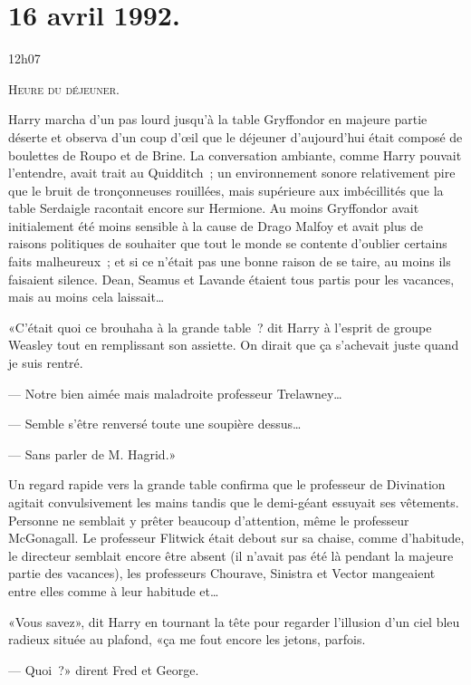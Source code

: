 
\section{16 avril 1992.}

12h07

\lettrine{H}{eure du déjeuner.}

\hplettrineextrapara
Harry marcha d'un pas lourd jusqu'à la table Gryffondor en majeure partie déserte et observa d'un coup d'œil que le déjeuner d'aujourd'hui était composé de boulettes de Roupo et de Brine. La conversation ambiante, comme Harry pouvait l'entendre, avait trait au Quidditch~; un environnement sonore relativement pire que le bruit de tronçonneuses rouillées, mais supérieure aux imbécillités que la table Serdaigle racontait encore sur Hermione. Au moins Gryffondor avait initialement été moins sensible à la cause de Drago Malfoy et avait plus de raisons politiques de souhaiter que tout le monde se contente d'oublier certains faits malheureux~; et si ce n'était pas une bonne raison de se taire, au moins ils faisaient silence. Dean, Seamus et Lavande étaient tous partis pour les vacances, mais au moins cela laissait…

«C'était quoi ce brouhaha à la grande table~? dit Harry à l'esprit de groupe Weasley tout en remplissant son assiette. On dirait que ça s'achevait juste quand je suis rentré.

--- Notre bien aimée mais maladroite professeur Trelawney…

--- Semble s'être renversé toute une soupière dessus…

--- Sans parler de M. Hagrid.»

Un regard rapide vers la grande table confirma que le professeur de Divination agitait convulsivement les mains tandis que le demi-géant essuyait ses vêtements. Personne ne semblait y prêter beaucoup d'attention, même le professeur McGonagall. Le professeur Flitwick était debout sur sa chaise, comme d'habitude, le directeur semblait encore être absent (il n'avait pas été là pendant la majeure partie des vacances), les professeurs Chourave, Sinistra et Vector mangeaient entre elles comme à leur habitude et…

«Vous savez», dit Harry en tournant la tête pour regarder l'illusion d'un ciel bleu radieux située au plafond, «ça me fout encore les jetons, parfois.

--- Quoi~?» dirent Fred et George.

